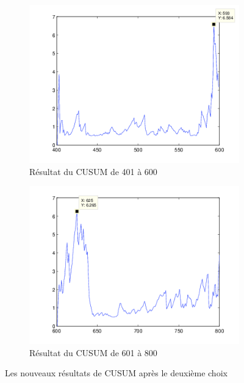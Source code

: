 \documentclass[french,11pt,notitlepage]{report}
\begin{document}
	\begin{figure}[hp]
		\begin{subfigure}[t]{.49\textwidth}
		  \includegraphics[width=\linewidth,height=.24\textheight]{mle121}
			\caption{Résultat du CUSUM de 401 à 600}
			\label{mle121}
		\end{subfigure}
		\hfill
		\begin{subfigure}[t]{.49\textwidth}
			\includegraphics[width=\linewidth,height=.24\textheight]{mle122}
			\caption{Résultat du CUSUM de 601 à 800}
			\label{mle122}
		\end{subfigure}
	\caption{Les nouveaux résultats de CUSUM après le deuxième choix}
	\label{testdikt3}
	\end{figure}
	
\end{document}
